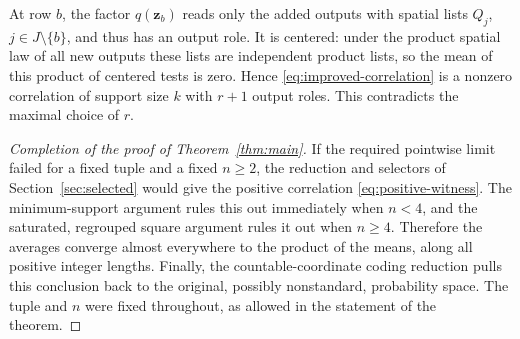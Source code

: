 At row $b$, the factor $q(\mathbf z_b)$ reads only the added outputs
with spatial lists $Q_j$, $j\in J\setminus\{b\}$, and thus has an
output role. It is centered: under the product spatial law of all
new outputs these lists are independent product lists, so the mean
of this product of centered tests is zero. Hence
\eqref{eq:improved-correlation} is a nonzero correlation of support
size $k$ with $r+1$ output roles. This contradicts the maximal
choice of $r$.

\begin{proof}[Completion of the proof of Theorem~\ref{thm:main}]
If the required pointwise limit failed for a fixed tuple and a
fixed $n\geq2$, the reduction and selectors of
Section~\ref{sec:selected} would give the positive correlation
\eqref{eq:positive-witness}. The minimum-support argument rules this
out immediately when $n<4$, and the saturated, regrouped square
argument rules it out when $n\geq4$. Therefore the averages converge
almost everywhere to the product of the means, along all positive
integer lengths. Finally, the countable-coordinate coding reduction
pulls this conclusion back to the original, possibly nonstandard,
probability space. The tuple and $n$ were fixed throughout, as allowed
in the statement of the theorem.
\end{proof}
